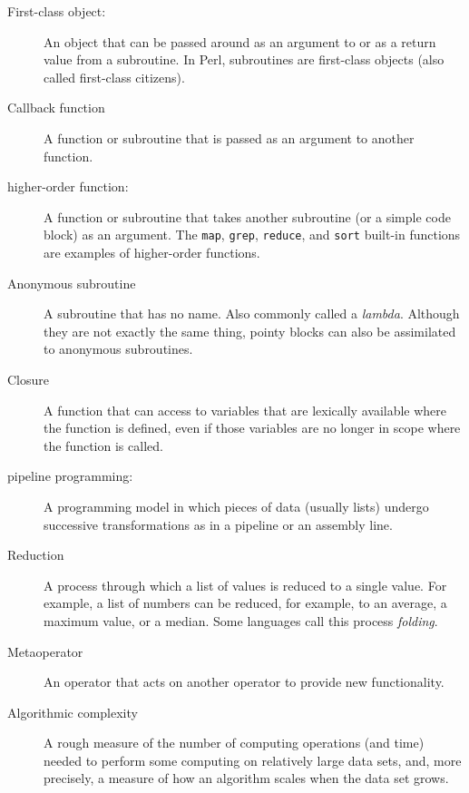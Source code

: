 \begin{description}

\item[First-class object:] An object that can be passed around 
as an argument to or as a return value from a subroutine. 
In Perl, subroutines are first-class objects (also called 
first-class citizens). 

\item[Callback function] A function or subroutine that is 
passed as an argument to another function.

\item[higher-order function:] A function or subroutine that takes 
another subroutine (or a simple code block) as an argument. The 
{\tt map}, {\tt grep}, {\tt reduce}, and {\tt sort} built-in 
functions are examples of higher-order functions.

\item[Anonymous subroutine] A subroutine that has no name. Also 
commonly called a \emph{lambda}. Although they are not exactly 
the same thing, pointy blocks can also be assimilated to 
anonymous subroutines.

\item[Closure] A function that can access to variables that 
are lexically available where the function is defined, even 
if those variables are no longer in scope where the function 
is called.

\item[pipeline programming:] A programming model in which 
pieces of data (usually lists) undergo successive 
transformations as in a pipeline or an assembly line.

\item[Reduction] A process through which a list of values is 
reduced to a single value. For example, a list of numbers 
can be reduced, for example, to an average, a maximum value, 
or a median. Some languages call this process \emph{folding}.

\item[Metaoperator] An operator that acts on another operator 
to provide new functionality.

\item[Algorithmic complexity] A rough measure of the number 
of computing operations (and time) needed to perform some 
computing on relatively large data sets, and, more precisely, 
a measure of how an algorithm scales when the data set grows.


\end{description}
